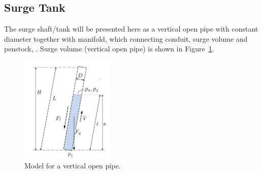 \documentclass[%
]{USN-PhD}
\begin{document}
\subsection{Surge Tank}

The surge shaft/tank will be presented here as a vertical open pipe with constant diameter together with manifold, which connecting conduit, surge volume and penstock, \cite{Sha:11,Val:17}. Surge volume (vertical open pipe) is shown in Figure~\ref{fig:fig9}.
\begin{figure}[!ht]
  \centering
 \includegraphics[width=0.4\textwidth]{fig/surgepic}
 \caption{Model for a vertical open pipe.}
  \label{fig:fig9}
\end{figure}
\end{document}
